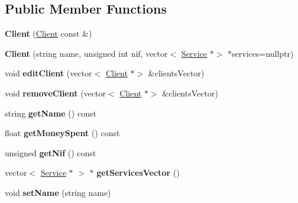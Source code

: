 \subsection*{Public Member Functions}
\begin{DoxyCompactItemize}
\item 
\mbox{\label{class_client_ad63288699ab4eb2a5f39e76fe76223b9}} 
{\bfseries Client} (\hyperlink{class_client}{Client} const \&)
\item 
\mbox{\label{class_client_a3cdfb856b1cccd81052f589c850ab86f}} 
{\bfseries Client} (string name, unsigned int nif, vector$<$ \hyperlink{class_service}{Service} $\ast$$>$ $\ast$services=nullptr)
\item 
\mbox{\label{class_client_ad9a4ac1aa117db0b279d2219ab776fac}} 
void {\bfseries edit\+Client} (vector$<$ \hyperlink{class_client}{Client} $\ast$$>$ \&clients\+Vector)
\item 
\mbox{\label{class_client_a7f845c33f4aa7b7081ae72d9a16c2d3f}} 
void {\bfseries remove\+Client} (vector$<$ \hyperlink{class_client}{Client} $\ast$$>$ \&clients\+Vector)
\item 
\mbox{\label{class_client_a5c473ba52d7678744edec9e51052c947}} 
string {\bfseries get\+Name} () const
\item 
\mbox{\label{class_client_a226ff919591e7fdfa6c386e9aa5300a5}} 
float {\bfseries get\+Money\+Spent} () const
\item 
\mbox{\label{class_client_a35c9fed8cdb36d28fd5e51bd2aee852e}} 
unsigned {\bfseries get\+Nif} () const
\item 
\mbox{\label{class_client_a13ab3e2d37fde2de5b6a40d4523bb999}} 
vector$<$ \hyperlink{class_service}{Service} $\ast$ $>$ $\ast$ {\bfseries get\+Services\+Vector} ()
\item 
\mbox{\label{class_client_a1c7f938360e23b3e0e52d17965f88725}} 
void {\bfseries set\+Name} (string name)
\item 
\mbox{\label{class_client_a8d0ab1a3c654d361dacde7e1d2b92c94}} 
$$
\end{DoxyCompactItemize}
